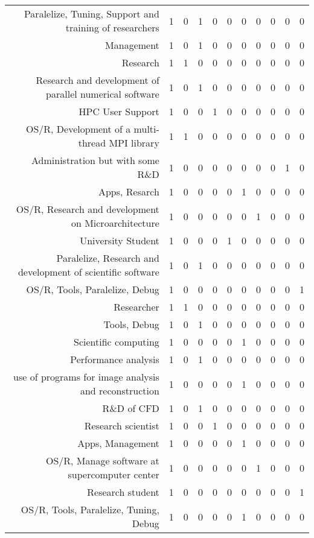{\begin{landscape}
\begin{longtable}[htb]{r|c|c|c|c|c|c|c|c|c|c}
{Paralelize, Tuning, Support and training of researchers} & 1 & 0 & 1 & 0 & 0 & 0 & 0 & 0 & 0 & 0 \\%
{Management} & 1 & 0 & 1 & 0 & 0 & 0 & 0 & 0 & 0 & 0 \\%
{Research} & 1 & 1 & 0 & 0 & 0 & 0 & 0 & 0 & 0 & 0 \\%
{Research and development of parallel numerical software} & 1 & 0 & 1 & 0 & 0 & 0 & 0 & 0 & 0 & 0 \\%
{HPC User Support} & 1 & 0 & 0 & 1 & 0 & 0 & 0 & 0 & 0 & 0 \\%
{OS/R, Development of a  multi-thread MPI library} & 1 & 1 & 0 & 0 & 0 & 0 & 0 & 0 & 0 & 0 \\%
{Administration but with some R\&D} & 1 & 0 & 0 & 0 & 0 & 0 & 0 & 0 & 1 & 0 \\%
{Apps, Resarch} & 1 & 0 & 0 & 0 & 0 & 1 & 0 & 0 & 0 & 0 \\%
{OS/R, Research and development on Microarchitecture} & 1 & 0 & 0 & 0 & 0 & 0 & 1 & 0 & 0 & 0 \\%
{University Student} & 1 & 0 & 0 & 0 & 1 & 0 & 0 & 0 & 0 & 0 \\%
{Paralelize, Research and development of scientific software} & 1 & 0 & 1 & 0 & 0 & 0 & 0 & 0 & 0 & 0 \\%
{OS/R, Tools, Paralelize, Debug} & 1 & 0 & 0 & 0 & 0 & 0 & 0 & 0 & 0 & 1 \\%
{Researcher} & 1 & 1 & 0 & 0 & 0 & 0 & 0 & 0 & 0 & 0 \\%
{Tools, Debug} & 1 & 0 & 1 & 0 & 0 & 0 & 0 & 0 & 0 & 0 \\%
{Scientific computing} & 1 & 0 & 0 & 0 & 0 & 1 & 0 & 0 & 0 & 0 \\%
{Performance analysis} & 1 & 0 & 1 & 0 & 0 & 0 & 0 & 0 & 0 & 0 \\%
{use of programs for image analysis and reconstruction} & 1 & 0 & 0 & 0 & 0 & 1 & 0 & 0 & 0 & 0 \\%
{R\&D of CFD} & 1 & 0 & 1 & 0 & 0 & 0 & 0 & 0 & 0 & 0 \\%
{Research scientist} & 1 & 0 & 0 & 1 & 0 & 0 & 0 & 0 & 0 & 0 \\%
{Apps, Management} & 1 & 0 & 0 & 0 & 0 & 1 & 0 & 0 & 0 & 0 \\%
{OS/R, Manage software at supercomputer center} & 1 & 0 & 0 & 0 & 0 & 0 & 1 & 0 & 0 & 0 \\%
{Research student} & 1 & 0 & 0 & 0 & 0 & 0 & 0 & 0 & 0 & 1 \\%
{OS/R, Tools, Paralelize, Tuning, Debug} & 1 & 0 & 0 & 0 & 0 & 1 & 0 & 0 & 0 & 0 \\%

\end{longtable}
\end{landscape}}
